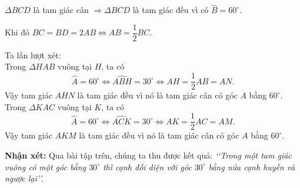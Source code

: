 \begin{bt}
{\begin{listEX}
			\begin{center}
				$\Delta BCD$ là tam giác cân $\Rightarrow \Delta BCD$ là tam giác đều vì có $\widehat{B}=60^{\circ}.$
			\end{center}
			Khi đó $BC=BD=2AB \Leftrightarrow AB=\dfrac{1}{2}BC.$
			\item Ta lần lượt xét:
				\\ Trong $\Delta HAB$ vuông tại $H$, ta có
				$$ \widehat{A}=60^{\circ} \Leftrightarrow \widehat{ABH}=30^{\circ} \Leftrightarrow AH=\dfrac{1}{2}AB=AN. $$
				Vậy tam giác $AHN$ là tam giác đều vì nó là tam giác cân có góc $A$ bằng $60^{\circ}.$
				\\ Trong $\Delta KAC$ vuông tại $K$, ta có
				$$ \widehat{A}=60^{\circ} \Leftrightarrow \widehat{ACK}=30^{\circ} \Leftrightarrow AK=\dfrac{1}{2}AC=AM. $$
				Vậy tam giác $AKM$ là tam giác đều vì nó là tam giác cân có góc $A$ bằng $60^{\circ}.$
		\end{listEX}
		\begin{note}
			\textbf{Nhận xét:} Qua bài tập trên, chúng ta thu được kết quả: \textit{\lq\lq Trong một tam giác vuông có một góc bằng $30^{\circ}$ thì cạnh đối diện với góc $30^{\circ}$ bằng nửa cạnh huyền và ngược lại\rq\rq.}
		\end{note}
	}
\end{bt}

